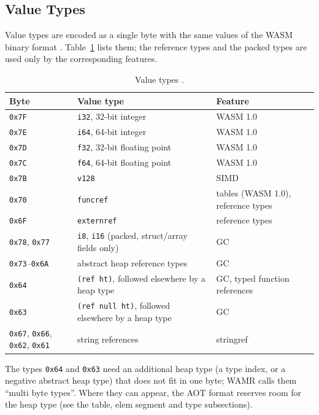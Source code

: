 \documentclass{article}
\begin{document}
\subsection{Value Types}
\label{sec:value-types}
Value types are encoded as a single byte with the same values of the WASM binary format \cite[Secs.~2.3.1 and 5.3.1]{webassembly2019core}.
Table~\ref{table:wasm-value-types} lists them; the reference types and the packed types are used only by the corresponding features.

\begin{table}[H]
\centering
\begin{tabular}{p{3cm}p{6.4cm}p{3.6cm}}
    \hline
    Byte & Value type & Feature \\
    \hline
    \verb|0x7F| & \verb|i32|, 32-bit integer & WASM 1.0 \\
    \verb|0x7E| & \verb|i64|, 64-bit integer & WASM 1.0 \\
    \verb|0x7D| & \verb|f32|, 32-bit floating point & WASM 1.0 \\
    \verb|0x7C| & \verb|f64|, 64-bit floating point & WASM 1.0 \\
    \verb|0x7B| & \verb|v128| & SIMD \\
    \verb|0x70| & \verb|funcref| & tables (WASM 1.0), reference types \\
    \verb|0x6F| & \verb|externref| & reference types \\
    \verb|0x78|, \verb|0x77| & \verb|i8|, \verb|i16| (packed, struct/array fields only) & GC \\
    \verb|0x73|--\verb|0x6A| & abstract heap reference types & GC \\
    \verb|0x64| & \verb|(ref ht)|, followed elsewhere by a heap type & GC, typed function references \\
    \verb|0x63| & \verb|(ref null ht)|, followed elsewhere by a heap type & GC \\
    \verb|0x67|, \verb|0x66|, \verb|0x62|, \verb|0x61| & string references & stringref \\
    \hline
\end{tabular}
\caption{Value types \cite[Secs.~2.3.1 and 5.3.1]{webassembly2019core}.}
\label{table:wasm-value-types}
\end{table}

The types \verb|0x64| and \verb|0x63| need an additional heap type (a type index, or a negative abstract heap type) that does not fit in one byte; WAMR calls them ``multi byte types''.
Where they can appear, the AOT format reserves room for the heap type (see the table, elem segment and type subsections).
\end{document}
